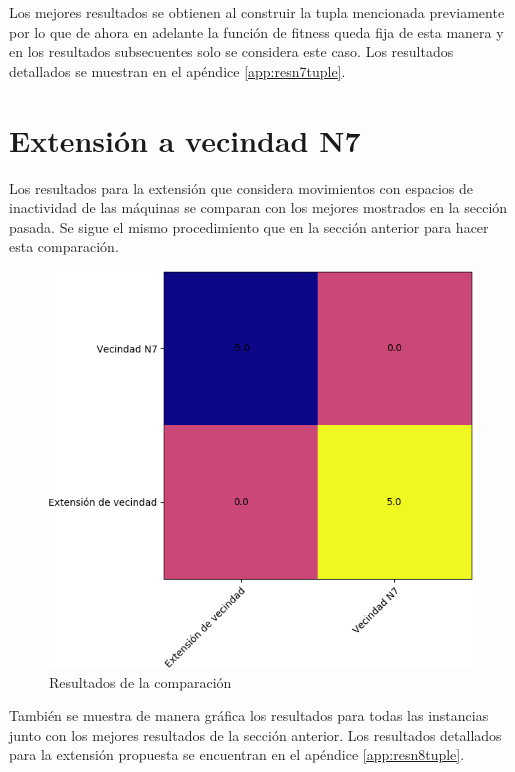 Los mejores resultados se obtienen al construir la tupla mencionada previamente por lo que de ahora en adelante la función de fitness queda fija de esta manera y en los resultados subsecuentes solo se considera este caso. Los resultados detallados se muestran en el apéndice \ref{app:resn7tuple}.

\section{Extensión a vecindad N7}
Los resultados para la extensión que considera movimientos con espacios de inactividad de las máquinas se comparan con los mejores mostrados en la sección pasada. Se sigue el mismo procedimiento que en la sección anterior para hacer esta comparación.

\begin{figure}[H]
    \centering
    \includegraphics[scale=.7]{Imagenes/n8vsn7.png}
    \caption{Resultados de la comparación}
\end{figure}

También se muestra de manera gráfica los resultados para todas las instancias junto con los mejores resultados de la sección anterior. Los resultados detallados para la extensión propuesta se encuentran en el apéndice \ref{app:resn8tuple}.

